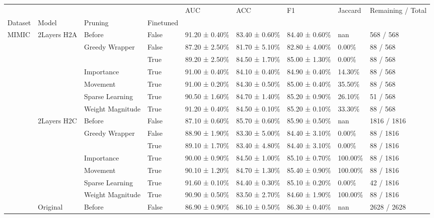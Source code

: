 \begin{tabular}{lllllllll}
\toprule
 &  &  &  & AUC & ACC & F1 & Jaccard & Remaining / Total \\
Dataset & Model & Pruning & Finetuned &  &  &  &  &  \\
\midrule
\multirow[t]{35}{*}{MIMIC} & \multirow[t]{7}{*}{2Layers H2A} & Before & False & 91.20 ± 0.40\% & 83.40 ± 0.60\% & 84.40 ± 0.60\% & nan & 568 / 568 \\
\cline{3-9}
 &  & \multirow[t]{2}{*}{Greedy Wrapper} & False & 87.20 ± 2.50\% & 81.70 ± 5.10\% & 82.80 ± 4.00\% & 0.00\% & 88 / 568 \\
 &  &  & True & 89.20 ± 2.50\% & 84.50 ± 1.70\% & 85.00 ± 1.30\% & 0.00\% & 88 / 568 \\
\cline{3-9}
 &  & Importance & True & 91.00 ± 0.40\% & 84.10 ± 0.40\% & 84.90 ± 0.40\% & 14.30\% & 88 / 568 \\
\cline{3-9}
 &  & Movement & True & 91.00 ± 0.20\% & 84.30 ± 0.50\% & 85.00 ± 0.40\% & 35.50\% & 88 / 568 \\
\cline{3-9}
 &  & Sparse Learning & True & 90.50 ± 1.60\% & 84.70 ± 1.40\% & 85.20 ± 0.90\% & 26.10\% & 51 / 568 \\
\cline{3-9}
 &  & Weight Magnitude & True & 91.20 ± 0.40\% & 84.50 ± 0.10\% & 85.20 ± 0.10\% & 33.30\% & 88 / 568 \\
\cline{2-9} \cline{3-9}
 & \multirow[t]{7}{*}{2Layers H2C} & Before & False & 87.10 ± 0.60\% & 85.70 ± 0.60\% & 85.90 ± 0.50\% & nan & 1816 / 1816 \\
\cline{3-9}
 &  & \multirow[t]{2}{*}{Greedy Wrapper} & False & 88.90 ± 1.90\% & 83.30 ± 5.00\% & 84.40 ± 3.10\% & 0.00\% & 88 / 1816 \\
 &  &  & True & 89.10 ± 1.70\% & 83.40 ± 4.80\% & 84.40 ± 3.10\% & 0.00\% & 88 / 1816 \\
\cline{3-9}
 &  & Importance & True & 90.00 ± 0.90\% & 84.50 ± 1.00\% & 85.10 ± 0.70\% & 100.00\% & 88 / 1816 \\
\cline{3-9}
 &  & Movement & True & 90.10 ± 1.20\% & 84.70 ± 1.30\% & 85.40 ± 0.90\% & 100.00\% & 88 / 1816 \\
\cline{3-9}
 &  & Sparse Learning & True & 91.60 ± 0.10\% & 84.40 ± 0.30\% & 85.10 ± 0.20\% & 0.00\% & 42 / 1816 \\
\cline{3-9}
 &  & Weight Magnitude & True & 90.90 ± 0.50\% & 83.50 ± 2.70\% & 84.60 ± 1.90\% & 100.00\% & 88 / 1816 \\
\cline{2-9} \cline{3-9}
 & \multirow[t]{7}{*}{Original} & Before & False & 86.90 ± 0.90\% & 86.10 ± 0.50\% & 86.30 ± 0.40\% & nan & 2628 / 2628 \\

\end{tabular}
